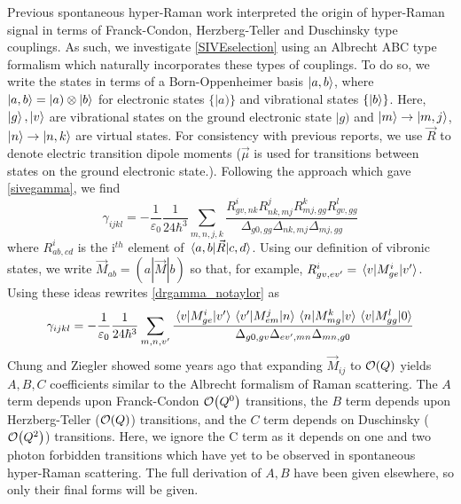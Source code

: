 \documentclass[aip, jcp, reprint, onecolumn]{revtex4-2}
\begin{document}
Previous spontaneous hyper-Raman work interpreted the origin of hyper-Raman signal in terms of Franck-Condon, Herzberg-Teller and Duschinsky type couplings.\cite{Ziegler1988} %
As such, we investigate \autoref{SIVEselection} using an Albrecht ABC type formalism which naturally incorporates these types of couplings.
To do so, we write the states in terms of a Born-Oppenheimer basis $\ket{a,b}$, where $\ket{a,b} = |a) \otimes \ket{b}$ for electronic states $\{|a)\}$ and vibrational states $\{\ket{b}\}$. \cite{BornOppenheimer, Albrecht1960}
Here, $\ket{g}, \ket{v}$ are vibrational states on the ground electronic state $|g)$ and $\ket{m} \rightarrow \ket{m,j}$, $\ket{n} \rightarrow \ket{n,k}$ are virtual states.
For consistency with previous reports, we use $\vec{R}$ to denote electric transition dipole moments ($\vec{\mu}$ is used for transitions between states on the ground electronic state.). \cite{Ziegler1974}
Following the approach which gave \autoref{sivegamma}, we find
\begin{equation}\label{drgamma_notaylor}
	\gamma_{ijkl} = -\frac{1}{\varepsilon_0} \frac{1}{24 \hbar^3} \sum_{m,n,j,k} \frac{
		R^{i}_{gv, nk} 
		R^{j}_{nk,mj} 
		R^{k}_{mj,gg} 
		R^{l}_{gv,gg} 
	}{\Delta_{g0,gg}
		\Delta_{nk, mj}
		\Delta_{mj, gg}
	}
\end{equation}
where $R^{i}_{ab,cd}$ is the i$^{th}$ element of $\mel{a,b}{\vec{R}}{c,d}$.\cite{Ziegler1988}
Using our definition of vibronic states, we write $\vec{M}_{ab} = (a|\vec{M}|b)$ so that, for example,
$R^{i}_{gv,ev'} = \mel{v}{M^i_{ge}}{v'}$.\cite{Albrecht1960}
Using these ideas rewrites \autoref{drgamma_notaylor} as
\begin{equation}\label{drgamma_notaylor_1}
	\begin{split}
		\gamma_{ijkl} &= -\frac{1}{\varepsilon_0} \frac{1}{24 \hbar^3} \sum_{m,n,v'} \frac{
			\mel{v}{M^{i}_{ge}}{v'} 
			\mel{v'}{M^{j}_{em}}{n}
			\mel{n}{M^{k}_{mg} }{v}
			\mel{v}{M^{l}_{gg}}{0}
		}{\Delta_{g0,gv}
			\Delta_{ev', mn}
			\Delta_{mn, g0}	} \\
	\end{split}
\end{equation}
Chung and Ziegler showed some years ago that expanding ${\vec{M}_{ij}}$ to $\order{Q}$ yields $A, B, C$ coefficients similar to the Albrecht formalism of Raman scattering. \cite{Albrecht1961, Ziegler1988}
The $A$ term depends upon Franck-Condon $\order{Q^0}$ transitions, the $B$ term depends upon Herzberg-Teller ($\order{Q}$) transitions, and the $C$ term depends on Duschinsky ($\order{Q^2}$) transitions. 
Here, we ignore the C term as it depends on one and two photon forbidden transitions which have yet to be observed in spontaneous hyper-Raman scattering. \cite{Ziegler1988}
The full derivation of $A,B$ have been given elsewhere, so only their final forms will be given.
\end{document}
